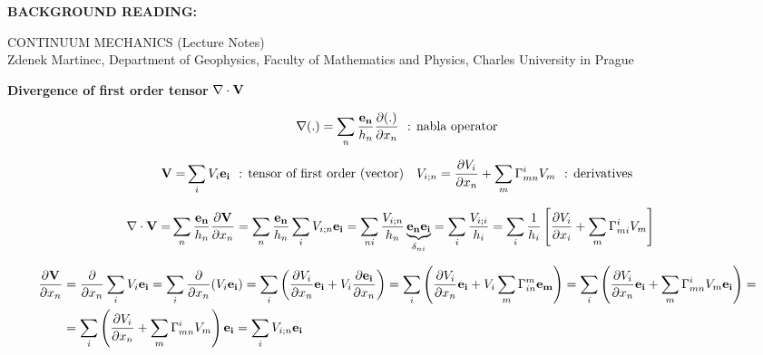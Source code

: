 \documentclass[11pt]{article}
\begin{document}
\begin{landscape}
\maketitle

\vspace{-0.6cm}

\noindent
{\bf{BACKGROUND READING:}} \\

\vspace{0.3cm}

\noindent
CONTINUUM MECHANICS (Lecture Notes) \\
Zdenek Martinec, Department of Geophysics, Faculty of Mathematics and Physics, Charles University in Prague \\

\vspace{-0.3cm}

\noindent
{{\bf{Divergence of first order tensor}} $\nabla \cdot {\bf{V}}$}

\begin{align}
\nabla (.) = \sum_n \frac{{\bf{e_n}}}{h_n}\frac{\partial (.)}{\partial x_n} \ \ \mbox{: nabla operator} \nonumber
\end{align}

\begin{align}
{\bf{V}} = &  \sum_i V_i {\bf{{e_i}}} \ \ \mbox{: tensor of first order (vector)} & V_{i;n} = \frac{\partial V_i}{\partial x_n} + \sum_m \Gamma_{mn}^i V_m \ \ \mbox{: derivatives} \nonumber
\end{align}
 
\begin{align}
\nabla \cdot {\bf{V}} = & \sum_n \frac{{\bf{e_n}}}{h_n}\frac{\partial {\bf{V}}}{\partial x_n} = \sum_n \frac{{\bf{e_n}}}{h_n} \sum_i V_{i;n} {\bf{e_i}} = \sum_{ni} \frac{V_{i;n}}{h_n} \underbrace{{\bf{e_n}}{\bf{e_i}}}_\text{$\delta_{ni}$} = \sum_i \frac{V_{i;i}}{h_i} = \sum_i \frac{1}{h_i} \left[ \frac{\partial V_i}{\partial x_i} + \sum_m \Gamma_{mi}^i V_m \right]
\end{align}


\begin{align}
\frac{\partial {\bf{V}}}{\partial x_n} & = \frac{\partial}{\partial x_n} \sum_i V_i {\bf{e_i}} = \sum_i \frac{\partial}{\partial x_n} (V_i {\bf{e_i}}) = \sum_i \left(\frac{\partial V_i}{\partial x_n} {\bf{e_i}} + V_i \frac{\partial {\bf{e_i}}}{\partial x_n} \right) = \sum_i \left(\frac{\partial V_i}{\partial x_n} {\bf{e_i}} + V_i \sum_m \Gamma_{in}^m {\bf{e_m}} \right) =  \sum_i \left(\frac{\partial V_i}{\partial x_n} {\bf{e_i}} + \sum_m \Gamma_{mn}^i V_m {\bf{e_i}} \right) = \nonumber \\
& = \sum_i \left(\frac{\partial V_i}{\partial x_n} + \sum_m \Gamma_{mn}^i V_m \right) {\bf{e_i}} = \sum_i V_{i;n} {\bf{e_i}}
\end{align}


\end{landscape}
\end{document}
